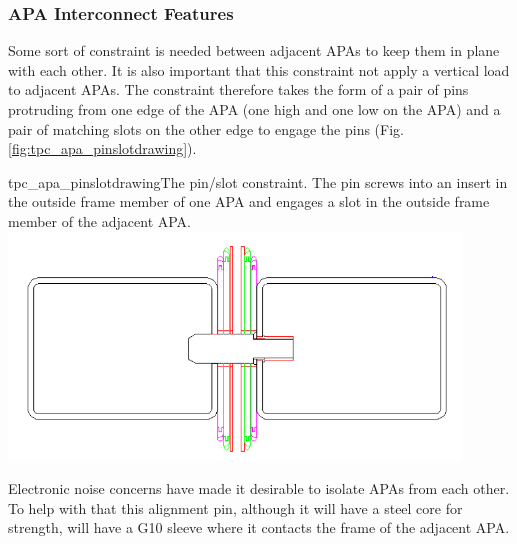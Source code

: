 \subsubsection{APA Interconnect Features}

Some sort of constraint is needed between adjacent APAs to keep them in plane with each other.  It is also important that this constraint not apply a vertical load to adjacent APAs.  The constraint therefore takes the form of a pair of pins protruding from one edge of the APA (one high and one low on the APA) and a pair of matching slots on the other edge to engage the pins (Fig. \ref{fig:tpc_apa_pinslotdrawing}).

\begin{cdrfigure}{tpc_apa_pinslotdrawing}{The pin/slot constraint.  The pin screws into an insert in the outside frame member of one APA and engages a slot in the outside frame member of the adjacent APA.}
\includegraphics[width=0.9\textwidth]{figures/tpc_apa_pinslotdrawing.png} 
\end{cdrfigure}

Electronic noise concerns have made it desirable to isolate APAs from each other.  To help with that this alignment pin, although it will have a steel core for strength, will have a G10 sleeve where it contacts the frame of the adjacent APA.




